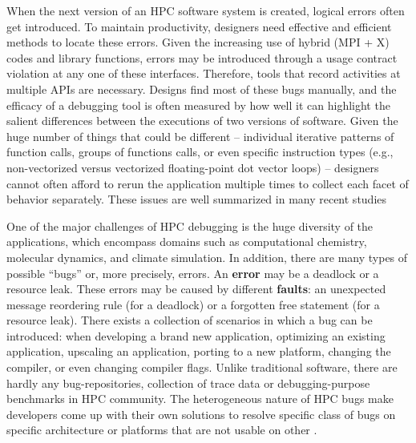 When the next version of an HPC software system is created, logical errors often get introduced.
%
To maintain productivity, designers need effective and efficient methods to locate these errors.
%
Given the increasing use of hybrid (MPI + X) codes and library functions, errors may be introduced through a usage contract violation at any one of these interfaces.
%
Therefore, tools that record activities at multiple APIs are necessary.
%
Designs find most of these bugs manually, and the efficacy of a debugging tool is
often measured by how well it can highlight the salient differences between the
executions of two versions of software.
%
Given the huge number of things that could be different -- individual iterative
patterns of function calls, groups of functions calls, or even specific instruction
types (e.g., non-vectorized versus vectorized floating-point dot vector loops) -- designers
cannot often afford to rerun the application multiple times to collect each facet
of behavior separately.
%
These issues are well summarized in many recent studies \cite{hpcdoe}



One of the major challenges of HPC debugging is the huge diversity of the applications, which encompass domains such as computational chemistry, molecular dynamics, and climate simulation.
%
In addition, there are many types of possible “bugs” or, more precisely, errors. An \textbf{error} may be a deadlock or a resource leak. These errors may be caused by different \textbf{faults}: an unexpected message reordering rule (for a deadlock) or a forgotten free statement (for a resource leak).
%
There exists a collection of scenarios in which a bug can be introduced: when developing a brand new application, optimizing an existing application, upscaling an application, porting to a new platform, changing the compiler, or even changing compiler flags.
%
 Unlike traditional software, there are hardly any bug-repositories, collection of trace data or debugging-purpose benchmarks in HPC community.
The heterogeneous nature of HPC bugs make developers come up with their own solutions to resolve specific class of bugs on specific architecture or platforms that are not usable on other \cite{hpcdoe}.

%


